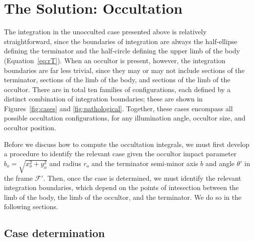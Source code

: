 \documentclass[modern]{aastex62}
\begin{document}
\section{The Solution: Occultation}
\label{sec:solution-occ}
%
The integration in the unocculted case presented above is relatively
straightforward, since
the boundaries of integration are always the half-ellipse defining the
terminator and the half-circle defining the upper limb of the body
(Equation~\ref{eq:rT}). When an occultor is present, however, the
integration boundaries are far less trivial, since they may or may not
include sections of the terminator, sections of the limb of the body,
and sections of the limb of the occultor. There are in total ten families of
configurations, each defined by a distinct combination of integration
boundaries; these are shown in Figures~\ref{fig:cases} and
\ref{fig:pathological}.
Together, these cases encompass all possible
occultation configurations, for any illumination angle, occultor size, and
occultor position.


Before we discuss how to compute the occultation integrals, we must first
develop a procedure to identify the relevant case given the occultor
impact parameter $b_o = \sqrt{x_o^2 + y_o^2}$ and radius $r_o$ and
the terminator semi-minor
axis $b$ and angle $\theta'$ in the frame $\mathcal{F}'$.
Then, once the case is determined, we must
identify the relevant integration boundaries, which depend on the points
of intesection between the limb of the body, the limb of the occultor, and
the terminator. We do so in the following sections.

%

\subsection{Case determination}
\label{sec:which-case}
\end{document}
